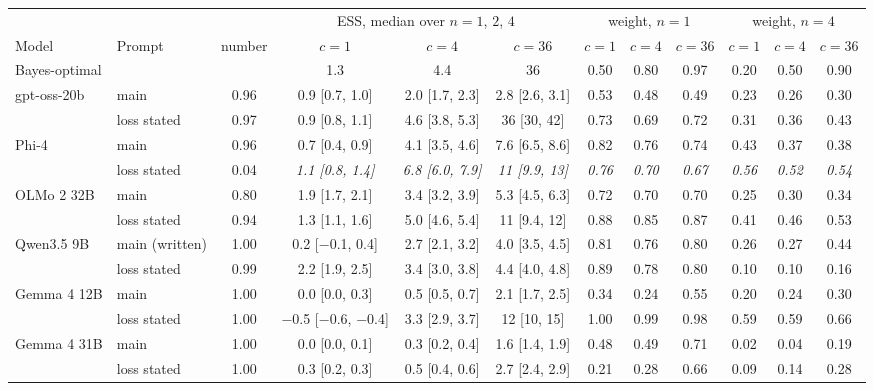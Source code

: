 \begin{tabular}{llcccccccccc}
\toprule
& & & \multicolumn{3}{c}{ESS, median over $n = 1$, $2$, $4$} & \multicolumn{3}{c}{weight, $n = 1$} & \multicolumn{3}{c}{weight, $n = 4$} \\
\cmidrule(lr){4-6} \cmidrule(lr){7-9} \cmidrule(lr){10-12}
Model & Prompt & number & $c = 1$ & $c = 4$ & $c = 36$ & $c = 1$ & $c = 4$ & $c = 36$ & $c = 1$ & $c = 4$ & $c = 36$ \\
\midrule
Bayes-optimal & & & 1.3 & 4.4 & 36 & 0.50 & 0.80 & 0.97 & 0.20 & 0.50 & 0.90 \\
\midrule
gpt-oss-20b & main & 0.96 & 0.9 {\scriptsize[0.7, 1.0]} & 2.0 {\scriptsize[1.7, 2.3]} & 2.8 {\scriptsize[2.6, 3.1]} & 0.53 & 0.48 & 0.49 & 0.23 & 0.26 & 0.30 \\
 & loss stated & 0.97 & 0.9 {\scriptsize[0.8, 1.1]} & 4.6 {\scriptsize[3.8, 5.3]} & 36 {\scriptsize[30, 42]} & 0.73 & 0.69 & 0.72 & 0.31 & 0.36 & 0.43 \\
\midrule
Phi-4 & main & 0.96 & 0.7 {\scriptsize[0.4, 0.9]} & 4.1 {\scriptsize[3.5, 4.6]} & 7.6 {\scriptsize[6.5, 8.6]} & 0.82 & 0.76 & 0.74 & 0.43 & 0.37 & 0.38 \\
 & loss stated & 0.04 & \textit{1.1 {\scriptsize[0.8, 1.4]}} & \textit{6.8 {\scriptsize[6.0, 7.9]}} & \textit{11 {\scriptsize[9.9, 13]}} & \textit{0.76} & \textit{0.70} & \textit{0.67} & \textit{0.56} & \textit{0.52} & \textit{0.54} \\
\midrule
OLMo 2 32B & main & 0.80 & 1.9 {\scriptsize[1.7, 2.1]} & 3.4 {\scriptsize[3.2, 3.9]} & 5.3 {\scriptsize[4.5, 6.3]} & 0.72 & 0.70 & 0.70 & 0.25 & 0.30 & 0.34 \\
 & loss stated & 0.94 & 1.3 {\scriptsize[1.1, 1.6]} & 5.0 {\scriptsize[4.6, 5.4]} & 11 {\scriptsize[9.4, 12]} & 0.88 & 0.85 & 0.87 & 0.41 & 0.46 & 0.53 \\
\midrule
Qwen3.5 9B & main (written) & 1.00 & 0.2 {\scriptsize[$-$0.1, 0.4]} & 2.7 {\scriptsize[2.1, 3.2]} & 4.0 {\scriptsize[3.5, 4.5]} & 0.81 & 0.76 & 0.80 & 0.26 & 0.27 & 0.44 \\
 & loss stated & 0.99 & 2.2 {\scriptsize[1.9, 2.5]} & 3.4 {\scriptsize[3.0, 3.8]} & 4.4 {\scriptsize[4.0, 4.8]} & 0.89 & 0.78 & 0.80 & 0.10 & 0.10 & 0.16 \\
\midrule
Gemma 4 12B & main & 1.00 & 0.0 {\scriptsize[0.0, 0.3]} & 0.5 {\scriptsize[0.5, 0.7]} & 2.1 {\scriptsize[1.7, 2.5]} & 0.34 & 0.24 & 0.55 & 0.20 & 0.24 & 0.30 \\
 & loss stated & 1.00 & $-$0.5 {\scriptsize[$-$0.6, $-$0.4]} & 3.3 {\scriptsize[2.9, 3.7]} & 12 {\scriptsize[10, 15]} & 1.00 & 0.99 & 0.98 & 0.59 & 0.59 & 0.66 \\
\midrule
Gemma 4 31B & main & 1.00 & 0.0 {\scriptsize[0.0, 0.1]} & 0.3 {\scriptsize[0.2, 0.4]} & 1.6 {\scriptsize[1.4, 1.9]} & 0.48 & 0.49 & 0.71 & 0.02 & 0.04 & 0.19 \\
 & loss stated & 1.00 & 0.3 {\scriptsize[0.2, 0.3]} & 0.5 {\scriptsize[0.4, 0.6]} & 2.7 {\scriptsize[2.4, 2.9]} & 0.21 & 0.28 & 0.66 & 0.09 & 0.14 & 0.28 \\
\bottomrule
\end{tabular}
